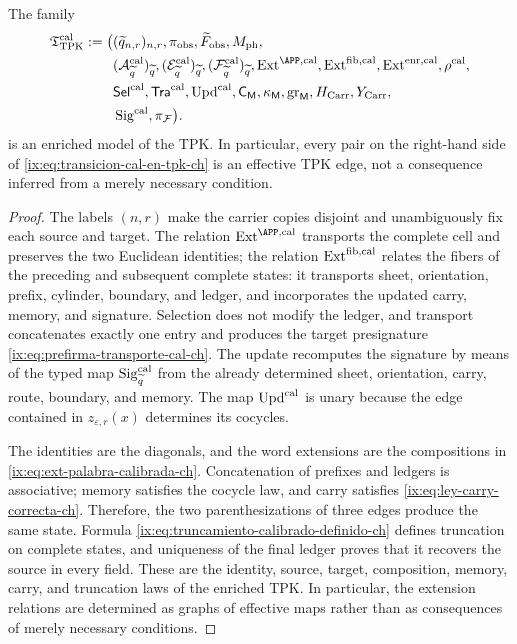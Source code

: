 \begin{proposition}
\label{ix:prop:modelo-tpk-calibrado-ch}
The family
\[
\begin{aligned}
 \mathfrak T_{\rm TPK}^{\rm cal}:=\bigl(
 &(\widetilde q_{n,r})_{n,r},\pi_{\rm obs},
   \widetilde F_{\rm obs},M_{\rm ph},\\
 &(\mathcal A_{\widetilde q}^{\rm cal})_{\widetilde q},
   (\mathcal E_{\widetilde q}^{\rm cal})_{\widetilde q},
   (\mathcal F_{\widetilde q}^{\rm cal})_{\widetilde q},
   \operatorname{Ext}^{\APP,\rm cal},
   \operatorname{Ext}^{\rm fib,cal},
   \operatorname{Ext}^{\rm enr,cal},\rho^{\rm cal},\\
 &\mathsf{Sel}^{\rm cal},\mathsf{Tra}^{\rm cal},
   \operatorname{Upd}^{\rm cal},\mathsf C_{\mathsf M},
   \kappa_{\mathsf M},\operatorname{gr}_{\mathsf M},
   H_{\rm Carr},Y_{\rm Carr},\\
 &\operatorname{Sig}^{\rm cal},\pi_{\mathcal F}\bigr).
\end{aligned}
\]
is an enriched model of the TPK. In particular, every pair on the right-hand
side of \eqref{ix:eq:transicion-cal-en-tpk-ch} is an effective TPK edge, not a
consequence inferred from a merely necessary condition.
\end{proposition}

\begin{proof}
The labels \((n,r)\) make the carrier copies disjoint and unambiguously fix
each source and target. The relation \(\operatorname{Ext}^{\APP,\rm cal}\)
transports the complete cell and preserves the two Euclidean identities; the
relation \(\operatorname{Ext}^{\rm fib,cal}\) relates the fibers of the
preceding and subsequent complete states: it transports sheet, orientation,
prefix, cylinder, boundary, and ledger, and incorporates the updated carry,
memory, and signature. Selection does not modify the ledger, and transport
concatenates exactly one entry and produces the target presignature
\eqref{ix:eq:prefirma-transporte-cal-ch}. The update recomputes the signature by
means of the typed map \(\operatorname{Sig}^{\rm cal}_{\widetilde q}\) from
the already determined sheet, orientation, carry, route, boundary, and memory.
The map \(\operatorname{Upd}^{\rm cal}\) is unary because the edge contained
in \(z_{\varepsilon,r}(x)\) determines its cocycles.

The identities are the diagonals, and the word extensions are the compositions
in \eqref{ix:eq:ext-palabra-calibrada-ch}. Concatenation of prefixes and ledgers
is associative; memory satisfies the cocycle law, and carry satisfies
\eqref{ix:eq:ley-carry-correcta-ch}. Therefore, the two parenthesizations of three
edges produce the same state. Formula
\eqref{ix:eq:truncamiento-calibrado-definido-ch} defines truncation on complete
states, and uniqueness of the final ledger proves that it recovers the source
in every field. These are the identity, source, target, composition, memory,
carry, and truncation laws of the enriched TPK. In particular, the extension
relations are determined as graphs of effective maps rather than as
consequences of merely necessary conditions.
\end{proof}

